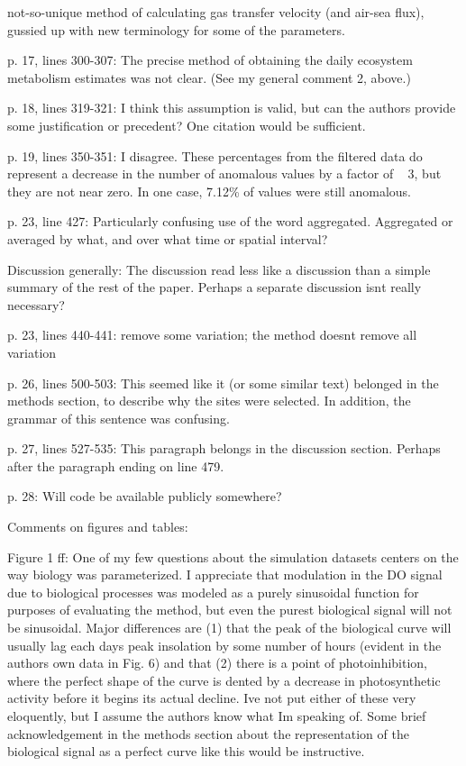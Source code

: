 \documentclass[letterpaper,12pt]{article}\usepackage[]{graphicx}\usepackage[]{color}
\begin{document}
not-so-unique method of calculating gas transfer velocity (and air-sea flux), gussied up with new terminology for some of the parameters.

p. 17, lines 300-307: The precise method of obtaining the daily ecosystem metabolism estimates was not clear. (See my general comment 2, above.)

p. 18, lines 319-321: I think this assumption is valid, but can the authors provide some justification or precedent? One citation would be sufficient.

p. 19, lines 350-351: I disagree. These percentages from the filtered data do represent a decrease
in the number of anomalous values by a factor of ~ 3, but they are not near zero. In one case,
7.12\% of values were still anomalous.

p. 23, line 427: Particularly confusing use of the word aggregated. Aggregated or averaged by
what, and over what time or spatial interval?

Discussion generally: The discussion read less like a discussion than a simple summary of the rest of the paper. Perhaps a separate discussion isnt really necessary?

p. 23, lines 440-441: remove some variation; the method doesnt remove all variation

p. 26, lines 500-503: This seemed like it (or some similar text) belonged in the methods section, to describe why the sites were selected. In addition, the grammar of this sentence was confusing.

p. 27, lines 527-535: This paragraph belongs in the discussion section. Perhaps after the paragraph ending on line 479.

p. 28: Will code be available publicly somewhere?

Comments on figures and tables:

Figure 1 ff: One of my few questions about the simulation datasets centers on the way biology was parameterized. I appreciate that modulation in the DO signal due to biological processes was modeled as a purely sinusoidal function for purposes of evaluating the method, but even the purest biological signal will not be sinusoidal. Major differences are (1) that the peak of the biological curve will usually lag each days peak insolation by some number of hours (evident in the authors own data in Fig. 6) and that (2) there is a point of photoinhibition, where the perfect shape of the curve is dented by a decrease in photosynthetic activity before it begins its actual decline. Ive not put either of these very eloquently, but I assume the authors know what Im speaking of. Some brief acknowledgement in the methods section about the representation of the biological signal as a perfect curve like this would be instructive.
\end{document}
